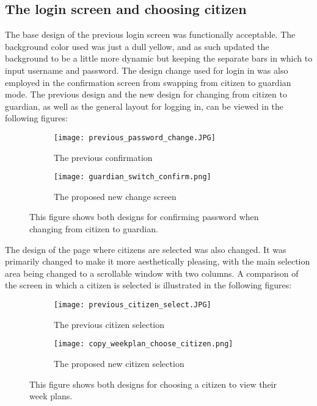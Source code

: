 \subsection{The login screen and choosing citizen}
The base design of the previous login screen was functionally acceptable. 
The background color used was just a dull yellow, and as such updated the background to be a little more dynamic but keeping the separate bars in which to input username and password.
The design change used for login in was also employed in the confirmation screen from swapping from citizen to guardian mode. 
The previous design and the new design for changing from citizen to guardian, as well as the general layout for logging in, can be viewed in the following figures:
\begin{figure}[H]
    \begin{subfigure}{0.5\textwidth}
    \texttt{[image: previous\_password\_change.JPG]} 
    \caption{The previous confirmation}
    \label{fig:previous_guardian_confirm}
    \end{subfigure}
    \begin{subfigure}{0.5\textwidth}
        \texttt{[image: guardian\_switch\_confirm.png]}
    \caption{The proposed new change screen}
    \label{fig:new_guardian_confirm}
    \end{subfigure} 
    \caption{This figure shows both designs for confirming password when changing from citizen to guardian.}
    \label{fig:guardian_confirm}
\end{figure}
\noindent
The design of the page where citizens are selected was also changed.
It was  primarily changed to make it more aesthetically pleasing, with the main selection area being changed to a scrollable window with two columns. 
A comparison of the screen in which a citizen is selected is illustrated in the following figures:
\begin{figure}[H]
    \begin{subfigure}{0.5\textwidth}
    \texttt{[image: previous\_citizen\_select.JPG]} 
    \caption{The previous citizen selection}
    \label{fig:previous_guardian_confirm}
    \end{subfigure}
    \begin{subfigure}{0.5\textwidth}
        \texttt{[image: copy\_weekplan\_choose\_citizen.png]}
    \caption{The proposed new citizen selection}
    \label{fig:new_guardian_confirm}
    \end{subfigure} 
    \caption{This figure shows both designs for choosing a citizen to view their week plans.}
    \label{fig:guardian_confirm}
\end{figure}
\noindent

